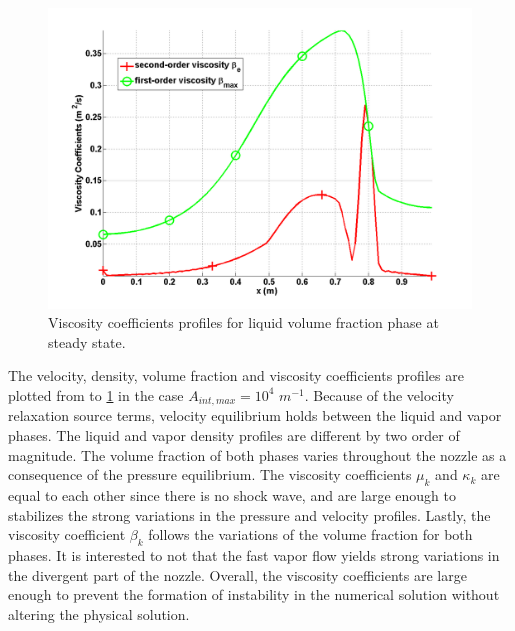 \begin{figure}[H]
\centering
\includegraphics[width=\textwidth]{figures/SEM/Aint1e4_liquid_beta.png}
\caption{Viscosity coefficients profiles for liquid volume fraction phase at steady state.}
\label{fig:two-fluids-rel-nozzle-visc-vf-sem-sect4}
\end{figure}
%
The velocity, density, volume fraction and viscosity coefficients profiles are plotted from  to \ref{fig:two-fluids-rel-nozzle-visc-vf-sem-sect4} in the case $A_{int,max} = 10^4$ $m^{-1}$. Because of the velocity relaxation source terms, velocity equilibrium holds between the liquid and vapor phases. The liquid and vapor density profiles are different by two order of magnitude. The volume fraction of both phases varies throughout the nozzle as a consequence of the pressure equilibrium. The viscosity coefficients $\mu_k$ and $\kappa_k$ are equal to each other since there is no shock wave, and are large enough to stabilizes the strong variations in the pressure and velocity profiles. Lastly, the viscosity coefficient $\beta_k$ follows the variations of the volume fraction for both phases. It is interested to not that the fast vapor flow yields strong variations in the divergent part of the nozzle. Overall, the viscosity coefficients are large enough to prevent the formation of instability in the numerical solution without altering the physical solution.\\
%

